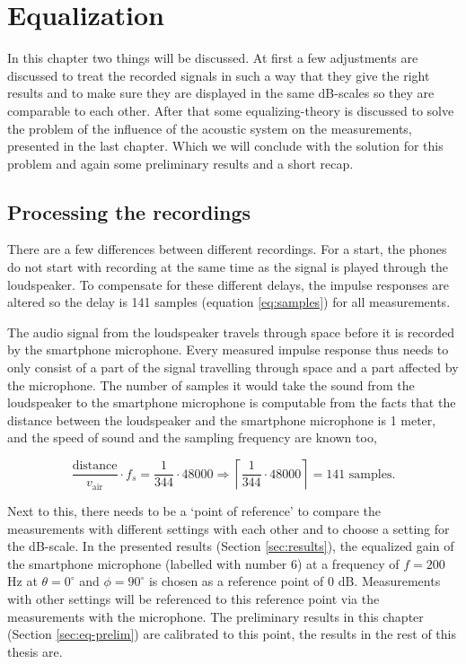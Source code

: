 \chapter{Equalization}
\label{chap:equalization}

In this chapter two things will be discussed.
At first a few adjustments are discussed to treat the recorded signals in such a way that they give the right results and to make sure they are displayed in the same dB-scales so they are comparable to each other.
After that some equalizing-theory is discussed to solve the problem of the influence of the acoustic system on the measurements, presented in the last chapter.
Which we will conclude with the solution for this problem and again some preliminary results and a short recap.

\section{Processing the recordings}
\label{sec:eq-proc_rec}
There are a few differences between different recordings.
For a start, the phones do not start with recording at the same time as the signal is played through the loudspeaker.
To compensate for these different delays, the impulse responses are altered so the delay is 141 samples (equation \eqref{eq:samples}) for all measurements.

The audio signal from the loudspeaker travels through space before it is recorded by the smartphone microphone.
Every measured impulse response thus needs to only consist of a part of the signal travelling through space and a part affected by the microphone.
The number of samples it would take the sound from the loudspeaker to the smartphone microphone is computable from the facts that the distance between the loudspeaker and the smartphone microphone is 1 meter, and the speed of sound and the sampling frequency are known too,

\begin{equation}
\label{eq:samples}
\dfrac{\text{distance}}{v_\text{air}} \cdot f_{s} = \frac{1}{344} \cdot 48000 \Rightarrow \left\lceil \frac{1}{344} \cdot 48000 \right\rceil = 141\text{ samples}.
\end{equation}

Next to this, there needs to be a `point of reference' to compare the measurements with different settings with each other and to choose a setting for the dB-scale.
In the presented results (Section \ref{sec:results}), the equalized gain of the smartphone microphone (labelled with number 6) at a frequency of $f=200$ Hz at $\theta=0^\circ$ and $\phi=90^\circ$ is chosen as a reference point of 0 dB.
Measurements with other settings will be referenced to this reference point via the measurements with the microphone.
The preliminary results in this chapter (Section \ref{sec:eq-prelim}) are calibrated to this point, the results in the rest of this thesis are.

